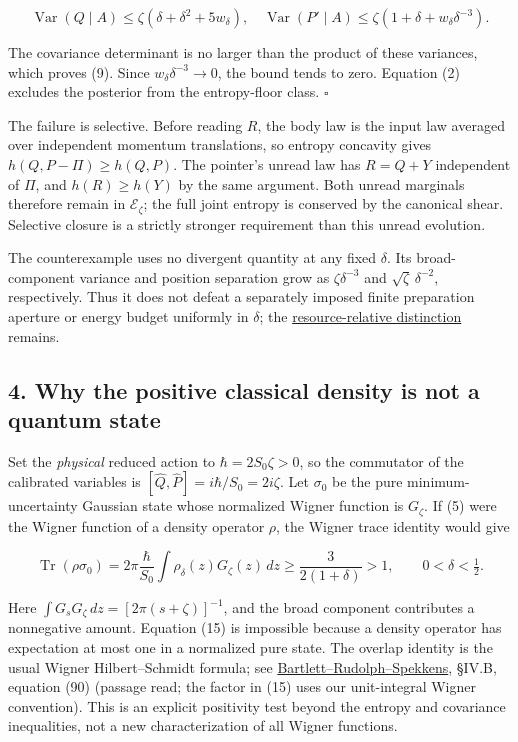 \documentclass[11pt,a4paper]{article}
\begin{document}
\[
 \operatorname{Var}(Q\mid A)\le\zeta(\delta+\delta^2+5w_\delta),\quad
 \operatorname{Var}(P'\mid A)\le\zeta(1+\delta+w_\delta\delta^{-3}).
 \tag{14}
\]

The covariance determinant is no larger than the product of these
variances, which proves (9). Since \(w_\delta\delta^{-3}\to0\), the
bound tends to zero. Equation (2) excludes the posterior from the
entropy-floor class. \(\square\)

The failure is selective. Before reading \(R\), the body law is the
input law averaged over independent momentum translations, so entropy
concavity gives \(h(Q,P-\Pi)\ge h(Q,P)\). The pointer's unread law has
\(R=Q+Y\) independent of \(\Pi\), and \(h(R)\ge h(Y)\) by the same
argument. Both unread marginals therefore remain in
\(\mathcal E_\zeta\); the full joint entropy is conserved by the
canonical shear. Selective closure is a strictly stronger requirement
than this unread evolution.

The counterexample uses no divergent quantity at any fixed \(\delta\).
Its broad-component variance and position separation grow as
\(\zeta\delta^{-3}\) and \(\sqrt\zeta\,\delta^{-2}\), respectively. Thus
it does not defeat a separately imposed finite preparation aperture or
energy budget uniformly in \(\delta\); the
\href{record-distance-path-length.md\#single-shot-displacement-and-the-aperture-theorem}{resource-relative
distinction} remains.

\hypertarget{why-the-positive-classical-density-is-not-a-quantum-state}{%
\subsection{4. Why the positive classical density is not a quantum
state}\label{why-the-positive-classical-density-is-not-a-quantum-state}}

Set the \emph{physical} reduced action to \(\hbar=2S_0\zeta>0\), so the
commutator of the calibrated variables is
\([\widehat Q,\widehat P]=i\hbar/S_0=2i\zeta\). Let \(\sigma_0\) be the
pure minimum-uncertainty Gaussian state whose normalized Wigner function
is \(G_\zeta\). If (5) were the Wigner function of a density operator
\(\rho\), the Wigner trace identity would give

\[
 \operatorname{Tr}(\rho\sigma_0)
 =2\pi\frac{\hbar}{S_0}\int\rho_\delta(z)G_\zeta(z)\,dz
 \ge \frac{3}{2(1+\delta)}>1,\qquad 0<\delta<\tfrac12. \tag{15}
\]

Here \(\int G_sG_\zeta\,dz=[2\pi(s+\zeta)]^{-1}\), and the broad
component contributes a nonnegative amount. Equation (15) is impossible
because a density operator has expectation at most one in a normalized
pure state. The overlap identity is the usual Wigner Hilbert--Schmidt
formula; see
\href{https://arxiv.org/pdf/1111.5057}{Bartlett--Rudolph--Spekkens},
§IV.B, equation (90) (passage read; the factor in (15) uses our
unit-integral Wigner convention). This is an explicit positivity test
beyond the entropy and covariance inequalities, not a new
characterization of all Wigner functions.
\end{document}
